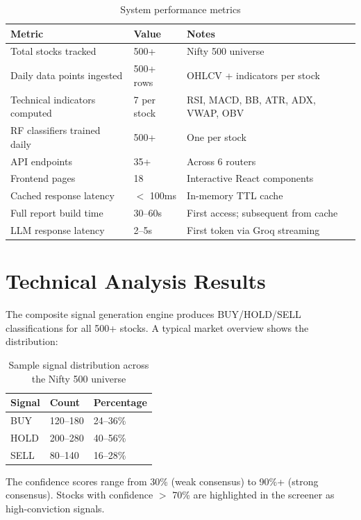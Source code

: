 \documentclass[12pt, a4paper, oneside]{report}
\begin{document}
\begin{table}[H]
\centering
\caption{System performance metrics}
\label{tab:system_performance}
\begin{tabularx}{\textwidth}{@{}l l X@{}}
\toprule
\textbf{Metric} & \textbf{Value} & \textbf{Notes} \\
\midrule
Total stocks tracked & 500+ & Nifty 500 universe \\
Daily data points ingested & 500+ rows & OHLCV + indicators per stock \\
Technical indicators computed & 7 per stock & RSI, MACD, BB, ATR, ADX, VWAP, OBV \\
RF classifiers trained daily & 500+ & One per stock \\
API endpoints & 35+ & Across 6 routers \\
Frontend pages & 18 & Interactive React components \\
Cached response latency & $<$ 100ms & In-memory TTL cache \\
Full report build time & 30--60s & First access; subsequent from cache \\
LLM response latency & 2--5s & First token via Groq streaming \\
\bottomrule
\end{tabularx}
\end{table}

\section{Technical Analysis Results}
\label{sec:results_technical}

The composite signal generation engine produces BUY/HOLD/SELL classifications for all 500+ stocks. A typical market overview shows the distribution:

\begin{table}[H]
\centering
\caption{Sample signal distribution across the Nifty 500 universe}
\label{tab:signal_distribution}
\begin{tabular}{@{}lll@{}}
\toprule
\textbf{Signal} & \textbf{Count} & \textbf{Percentage} \\
\midrule
BUY & 120--180 & 24--36\% \\
HOLD & 200--280 & 40--56\% \\
SELL & 80--140 & 16--28\% \\
\bottomrule
\end{tabular}
\end{table}

The confidence scores range from 30\% (weak consensus) to 90\%+ (strong consensus). Stocks with confidence $>$ 70\% are highlighted in the screener as high-conviction signals.
\end{document}

